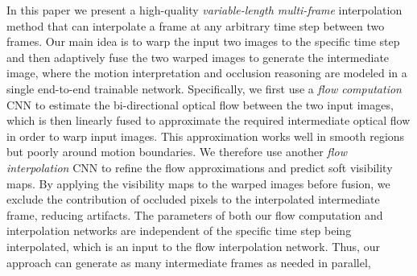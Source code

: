 \documentclass[10pt,twocolumn,letterpaper]{article}
\newcommand{\vjcomment}[1]{{\color{green}VJ: #1}}
\newcommand{\JK}[1]{{\color{magenta}JK: #1}}
\begin{document}
In this paper we present a high-quality \emph{variable-length multi-frame} interpolation method that can interpolate a frame at any arbitrary time step between two frames.  Our main idea is to warp the input two images to the specific time step and then adaptively fuse the two warped images to generate the intermediate image, where the motion interpretation and occlusion reasoning are modeled in a single end-to-end trainable network. Specifically, we first use a \emph{flow computation} CNN to estimate the bi-directional optical flow between the two input images, which is then linearly fused to approximate the required intermediate optical flow in order to warp input images. This approximation works well in smooth regions but poorly around motion boundaries. We therefore use another \emph{flow interpolation} CNN to refine the flow approximations and predict soft visibility maps. By applying the visibility maps to the warped images before fusion, we exclude the contribution of occluded pixels to the interpolated intermediate frame, reducing artifacts. 
The parameters of both our flow computation and interpolation networks are independent of the specific time step being interpolated, which is an input to the flow interpolation network.
Thus, our approach can generate as many intermediate frames as needed in parallel, 

\end{document}
